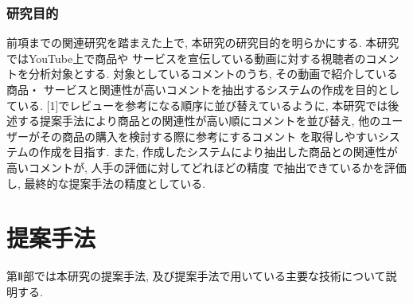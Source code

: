 \documentclass{ltjarticle}
\begin{document}
\section{研究目的}
前項までの関連研究を踏まえた上で, 本研究の研究目的を明らかにする. 本研究ではYouTube上で商品や
サービスを宣伝している動画に対する視聴者のコメントを分析対象とする. 対象としているコメントのうち, その動画で紹介している商品・
サービスと関連性が高いコメントを抽出するシステムの作成を目的としている. [1]でレビューを参考になる順序に並び替えているように, 
本研究では後述する提案手法により商品との関連性が高い順にコメントを並び替え, 他のユーザーがその商品の購入を検討する際に参考にするコメント
を取得しやすいシステムの作成を目指す. また, 作成したシステムにより抽出した商品との関連性が高いコメントが, 人手の評価に対してどれほどの精度
で抽出できているかを評価し, 最終的な提案手法の精度としている. 

\newpage
\part{提案手法}
第Ⅱ部では本研究の提案手法, 及び提案手法で用いている主要な技術について説明する. 
\end{document}
